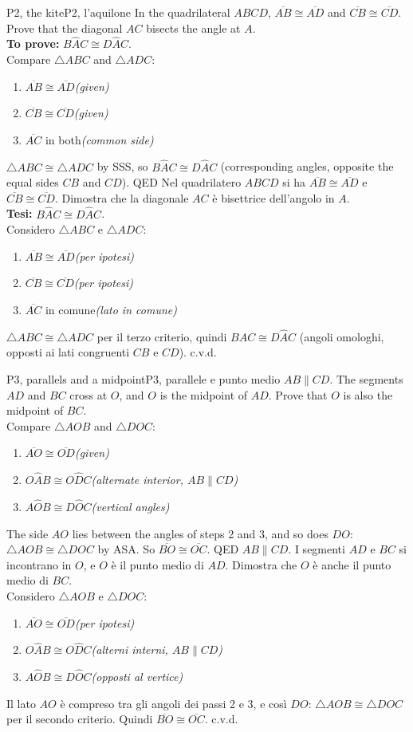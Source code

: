 \documentclass[10pt,a4paper,oneside]{book}
\newcommand{\ang}[3]{#1\widehat{#2}#3}      %
\newcommand{\seg}[1]{\overline{#1}}         %
\newcommand{\tri}[1]{\triangle #1}          %
\newcommand{\step}[2]{\item #1\hfill{\small\color{slate}\itshape(#2)}}
\newenvironment{steps}{\begin{enumerate}[label=\arabic*., leftmargin=1.5em, itemsep=1pt]}{\end{enumerate}}
\begin{document}
\begin{proofbox}{P2, the kite}{P2, l'aquilone}
In the quadrilateral $ABCD$, $\seg{AB} \cong \seg{AD}$ and $\seg{CB} \cong \seg{CD}$. Prove that the diagonal $AC$ bisects the angle at $A$.\\
\textbf{To prove:} $\ang{B}{A}{C} \cong \ang{D}{A}{C}$.\\
Compare $\tri{ABC}$ and $\tri{ADC}$:
\begin{steps}
\step{$\seg{AB} \cong \seg{AD}$}{given}
\step{$\seg{CB} \cong \seg{CD}$}{given}
\step{$\seg{AC}$ in both}{common side}
\end{steps}
$\tri{ABC} \cong \tri{ADC}$ by SSS, so $\ang{B}{A}{C} \cong \ang{D}{A}{C}$ (corresponding angles, opposite the equal sides $CB$ and $CD$). \hfill QED
\tcblower
Nel quadrilatero $ABCD$ si ha $\seg{AB} \cong \seg{AD}$ e $\seg{CB} \cong \seg{CD}$. Dimostra che la diagonale $AC$ è bisettrice dell'angolo in $A$.\\
\textbf{Tesi:} $\ang{B}{A}{C} \cong \ang{D}{A}{C}$.\\
Considero $\tri{ABC}$ e $\tri{ADC}$:
\begin{steps}
\step{$\seg{AB} \cong \seg{AD}$}{per ipotesi}
\step{$\seg{CB} \cong \seg{CD}$}{per ipotesi}
\step{$\seg{AC}$ in comune}{lato in comune}
\end{steps}
$\tri{ABC} \cong \tri{ADC}$ per il terzo criterio, quindi $\ang{B}{A}{C} \cong \ang{D}{A}{C}$ (angoli omologhi, opposti ai lati congruenti $CB$ e $CD$). \hfill c.v.d.
\end{proofbox}

\begin{proofbox}{P3, parallels and a midpoint}{P3, parallele e punto medio}
$AB \parallel CD$. The segments $AD$ and $BC$ cross at $O$, and $O$ is the midpoint of $AD$. Prove that $O$ is also the midpoint of $BC$.\\
Compare $\tri{AOB}$ and $\tri{DOC}$:
\begin{steps}
\step{$\seg{AO} \cong \seg{OD}$}{given}
\step{$\ang{O}{A}{B} \cong \ang{O}{D}{C}$}{alternate interior, $AB \parallel CD$}
\step{$\ang{A}{O}{B} \cong \ang{D}{O}{C}$}{vertical angles}
\end{steps}
The side $AO$ lies between the angles of steps 2 and 3, and so does $DO$: $\tri{AOB} \cong \tri{DOC}$ by ASA. So $\seg{BO} \cong \seg{OC}$. \hfill QED
\tcblower
$AB \parallel CD$. I segmenti $AD$ e $BC$ si incontrano in $O$, e $O$ è il punto medio di $AD$. Dimostra che $O$ è anche il punto medio di $BC$.\\
Considero $\tri{AOB}$ e $\tri{DOC}$:
\begin{steps}
\step{$\seg{AO} \cong \seg{OD}$}{per ipotesi}
\step{$\ang{O}{A}{B} \cong \ang{O}{D}{C}$}{alterni interni, $AB \parallel CD$}
\step{$\ang{A}{O}{B} \cong \ang{D}{O}{C}$}{opposti al vertice}
\end{steps}
Il lato $AO$ è compreso tra gli angoli dei passi 2 e 3, e così $DO$: $\tri{AOB} \cong \tri{DOC}$ per il secondo criterio. Quindi $\seg{BO} \cong \seg{OC}$. \hfill c.v.d.
\end{proofbox}
\end{document}
